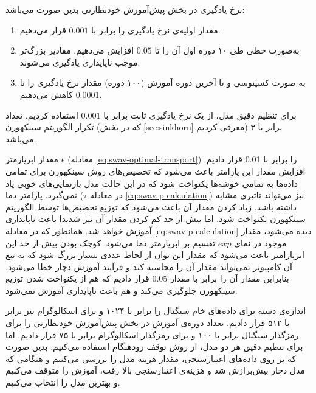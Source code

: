 نرخ یادگیری در بخش پیش‌آموزش خودنظارتی بدین صورت می‌باشد:
\begin{enumerate}
    \item مقدار اولیه‌ی نرخ یادگیری را برابر با $0.001$ قرار می‌دهیم.
    \item به‌صورت خطی طی ۱۰ دوره اول آن را تا $0.05$ افزایش می‌دهیم. مقادیر بزرگ‌تر موجب ناپایداری یادگیری می‌شوند.
    \item به صورت کسینوسی و تا آخرین دوره آموزش (۱۰۰ دوره) مقدار نرخ یادگیری را تا $0.0001$ کاهش می‌دهیم.
\end{enumerate}
برای تنظیم دقیق مدل، از یک نرخ یادگیری ثابت برابر با $0.001$ استفاده کردیم.
تعداد تکرار الگوریتم سینکهورن (که در بخش \ref{sec:sinkhorn} معرفی کردیم) برابر با ۳ می‌باشد.

مقدار ابرپارمتر $\epsilon$ (معادله \ref{eq:swav-optimal-transport}) را برابر با 0.01 قرار دادیم. افزایش مقدار این پارامتر باعث می‌شود که تخصیص‌های روش سینکهورن برای تمامی داده‌ها به تمامی خوشه‌ها یکنواخت شود که در این حالت مدل بازنمایی‌های خوبی یاد نمی‌گیرد. پارامتر دما ($\tau$ در معادله \ref{eq:swav-p-calculation}) نیز می‌تواند تاثیری مشابه داشته باشد. زیاد کردن مقدار آن باعث می‌شود که توزیع تخصیص‌ها توسط الگوریتم سینکهورن یکنواخت شود. اما بیش از حد کم کردن مقدار آن نیز شدیدا باعث ناپایداری آموزش خواهد شد. همانطور که در معادله \ref{eq:swav-p-calculation} دیده می‌شود،
مقدار موجود در نمای $exp$ تقسیم بر ابرپارمتر دما می‌شود. کوچک بودن بیش از حد این ابرپارامتر باعث می‌شود که مقدار این توان از لحاظ عددی بسیار بزرگ شود که به تبع آن کامپیوتر نمی‌تواند مقدار آن را محاسبه کند و فرآیند آموزش دچار  خطا می‌شود. بنابراین مقدار آن را برابر با مقدار 0.05 قرار دادیم که هم از یکنواخت شدن توزیع سینکهورن جلوگیری می‌کند و هم باعث ناپایداری آموزش نمی‌شود.

اندازه‌ی دسته برای داده‌های خام سیگنال را برابر با ۱۰۲۴ و برای اسکالوگرام نیز برابر با ۵۱۲ قرار دادیم. تعداد دوره‌ی آموزش در بخش پیش‌آموزش خودنظارتی را برای رمزگذار سیگنال برابر با ۱۰۰ و برای رمزگذار اسکالوگرام برابر با ۷۵ قرار دادیم. اما برای تنظیم دقیق هر دو مدل، از روش توقف زودهنگام
استفاده می‌کنیم. بدین صورت که بر روی داده‌های اعتبارسنجی، مقدار هزینه مدل را بررسی می‌کنیم و هنگامی که مدل دچار بیش‌برازش شد و هزینه‌ی اعتبارسنجی بالا رفت، آموزش را متوقف می‌کنیم و بهترین مدل را انتخاب می‌کنیم.
